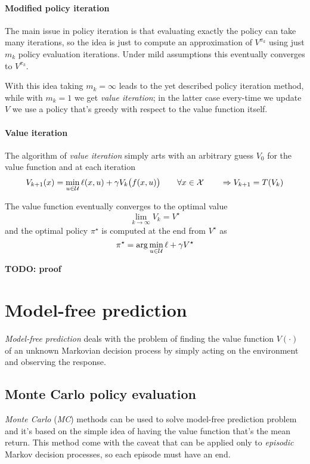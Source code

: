 	\paragraph{Modified policy iteration} The main issue in policy iteration is that evaluating exactly the policy can take many iterations, so the idea is just to compute an approximation of $V^{\pi_k}$ using just $m_k$ policy evaluation iterations. Under mild assumptions this eventually converges to $V^{\pi_k}$.
	
	With this idea taking $m_k = \infty$ leads to the yet described policy iteration method, while with $m_k = 1$ we get \textit{value iteration}; in the latter case every-time we update $V$ we use a policy that's greedy with respect to the value function itself.
	
	\paragraph{Value iteration} The algorithm of \textit{value iteration} simply arts with an arbitrary guess $V_0$ for the value function and at each iteration 
	\[ V_{k+1}(x) = \min_{u\in\mathcal U} \ell(x,u) + \gamma V_k\big(f(x,u)\big) \qquad \forall x \in \mathcal X \qquad \Rightarrow V_{k+1} = T(V_k) \]
	
	The value function eventually converges to the optimal value
	\[ \lim_{k\rightarrow \infty} V_k = V^\star \]
	and the optimal policy $\pi^\star$ is computed at the end from $V^\star$ as
	\[ \pi^\star = \arg\min_{u\in\mathcal U} \ell + \gamma V^\star \]
	
	\textbf{TODO: proof}
	
	
\section{Model-free prediction}
	\textit{Model-free prediction} deals with the problem of finding the value function $V(\cdot)$ of an unknown Markovian decision process by simply acting on the environment and observing the response. 
	
\subsection{Monte Carlo policy evaluation} \label{sec:montecarlo}
	\textit{Monte Carlo} (\textit{MC}) methods can be used to solve model-free prediction problem and it's based on the simple idea of having the value function that's the mean return. This method come with the caveat that can be applied only to \textit{episodic} Markov decision processes, so each episode must have an end.
	
